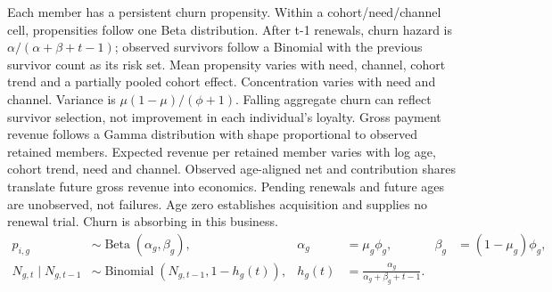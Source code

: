 \documentclass[10pt]{article}
\begin{document}
Each member has a persistent churn propensity. Within a cohort/need/channel cell, propensities follow one Beta distribution. After t-1 renewals, churn hazard is $\alpha/(\alpha+\beta+t-1)$; observed survivors follow a Binomial with the previous survivor count as its risk set. Mean propensity varies with need, channel, cohort trend and a partially pooled cohort effect. Concentration varies with need and channel. Variance is $\mu(1-\mu)/(\phi+1)$. Falling aggregate churn can reflect survivor selection, not improvement in each individual's loyalty. Gross payment revenue follows a Gamma distribution with shape proportional to observed retained members. Expected revenue per retained member varies with log age, cohort trend, need and channel. Observed age-aligned net and contribution shares translate future gross revenue into economics. Pending renewals and future ages are unobserved, not failures. Age zero establishes acquisition and supplies no renewal trial. Churn is absorbing in this business.
\[\begin{aligned}p_{i,g}&\sim\operatorname{Beta}(\alpha_g,\beta_g), & \alpha_g&=\mu_g\phi_g, &\beta_g&=(1-\mu_g)\phi_g,\\N_{g,t}\mid N_{g,t-1}&\sim\operatorname{Binomial}(N_{g,t-1},1-h_g(t)), & h_g(t)&=\frac{\alpha_g}{\alpha_g+\beta_g+t-1}.\end{aligned}\]
\end{document}
